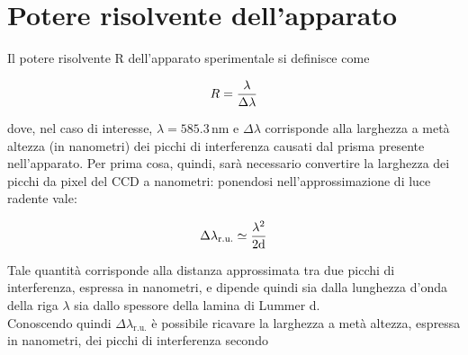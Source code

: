 \documentclass[twocolumn,10pt]{asme2ej}
\begin{document}
\section{Potere risolvente dell'apparato}\label{s:risolvente}



Il potere risolvente R dell'apparato sperimentale si definisce come

\vspace{-15pt}
\begin{equation}
    R = \frac{\lambda}{\Delta\lambda}
    \label{e:r}
\vspace{-5pt}
\end{equation}

dove, nel caso di interesse, $\lambda = 585.3 \,\si{\nano\metre}$ e $\Delta\lambda$ corrisponde alla larghezza a metà
altezza (in nanometri) dei picchi di interferenza causati dal prisma presente nell'apparato. Per prima cosa, quindi,
sarà necessario convertire la larghezza dei picchi da pixel del CCD a nanometri: ponendosi nell'approssimazione di luce
radente vale:

\vspace{-10pt}
\begin{equation}
    \Delta\lambda_{\text{r.u.}} \simeq \frac{\lambda^2}{2\text{d}}
    \label{e:dlambdaru}
\vspace{-5pt}
\end{equation}

Tale quantità corrisponde alla distanza approssimata tra due picchi di interferenza, espressa in nanometri, e dipende
quindi sia dalla lunghezza d'onda della riga $\lambda$ sia dallo spessore della lamina di Lummer d.\\
Conoscendo quindi $\Delta\lambda_{\text{r.u.}}$ è possibile ricavare la larghezza a metà altezza, espressa in nanometri,
dei picchi di interferenza secondo
\end{document}
